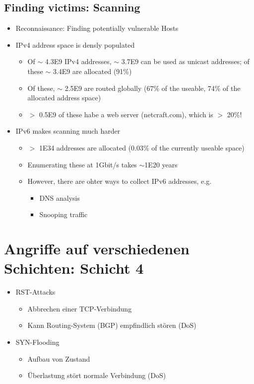 \documentclass[openany]{book}
\begin{document}
\subsection{Finding victims: Scanning}

\begin{itemize}
    \item Reconnaissance: Finding potentially vulnerable Hosts
    \item IPv4 address space is densly populated
    \begin{itemize}
        \item Of $\sim$ 4.3E9 IPv4 addresses, $\sim$ 3.7E9 can be used as unicast addresses; of these $\sim$ 3.4E9 are allocated (91\%)
        \item Of these, $\sim$ 2.5E9 are routed globally (67\% of the useable, 74\% of the allocated address space)
        \item $>$ 0.5E9 of these habe a web server (netcraft.com), which is $>$ 20\%! 
    \end{itemize}
    \item IPv6 makes scanning much harder
    \begin{itemize}
        \item $>$ 1E34 addresses are allocated (0.03\% of the currently useable space)
        \item Enumerating these at 1Gbit/s takes $\sim$1E20 years
        \item However, there are ohter ways to collect IPv6 addresses, e.g.
        \begin{itemize}
            \item DNS analysis
            \item Snooping traffic
        \end{itemize}
    \end{itemize}
\end{itemize}

\section{Angriffe auf verschiedenen Schichten: Schicht 4}

\begin{itemize}
    \item RST-Attacks
    \begin{itemize}
        \item Abbrechen einer TCP-Verbindung
        \item Kann Routing-System (BGP) empfindlich stören (DoS)
    \end{itemize}
    \item SYN-Flooding
    \begin{itemize}
        \item Aufbau von Zustand
        \item Überlastung stört normale Verbindung (DoS)
    \end{itemize}
\end{itemize}
\end{document}
